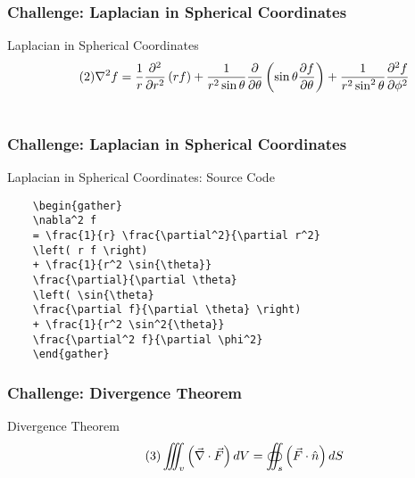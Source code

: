 \begin{frame}[fragile]
\frametitle{Challenge: Laplacian in Spherical Coordinates} 
\begin{alertblock}{Laplacian in Spherical Coordinates}
    \begin{gather} \tag{2}
    \nabla^2 f 
    = \frac{1}{r} \frac{\partial^2}{\partial r^2} \left( r f \right) 
    + \frac{1}{r^2 \sin{\theta}} \frac{\partial}{\partial \theta} \left( \sin{\theta} \frac{\partial f}{\partial \theta} \right) 
    + \frac{1}{r^2 \sin^2{\theta}} \frac{\partial^2 f}{\partial \phi^2} \\ \notag
    \end{gather}
\end{alertblock}
\end{frame}


\begin{frame}[fragile]
\frametitle{Challenge: Laplacian in Spherical Coordinates} 
\begin{alertblock}{Laplacian in Spherical Coordinates: Source Code}
    \small
    \begin{verbatim}
    \begin{gather}
    \nabla^2 f 
    = \frac{1}{r} \frac{\partial^2}{\partial r^2} 
    \left( r f \right) 
    + \frac{1}{r^2 \sin{\theta}} 
    \frac{\partial}{\partial \theta} 
    \left( \sin{\theta} 
    \frac{\partial f}{\partial \theta} \right) 
    + \frac{1}{r^2 \sin^2{\theta}} 
    \frac{\partial^2 f}{\partial \phi^2}
    \end{gather}
    \end{verbatim}
\end{alertblock}
\end{frame}


\begin{frame}[fragile]
\frametitle{Challenge: Divergence Theorem} 
\begin{alertblock}{Divergence Theorem}
    \begin{gather} \tag{3}
    \iiint_v \left( \Vec{\nabla} \cdot \Vec{F} \right) dV = \oiint_s \left( \Vec{F} \cdot \hat{n} \right) dS \\ \notag
    \end{gather}
\end{alertblock}
\end{frame}


